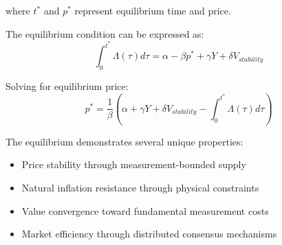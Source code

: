 \documentclass[12pt,a4paper]{article}
\begin{document}
where $t^*$ and $p^*$ represent equilibrium time and price.

The equilibrium condition can be expressed as:
\begin{equation}
\int_0^{t^*} \Lambda(\tau) d\tau = \alpha - \beta p^* + \gamma Y + \delta V_{stability}
\end{equation}

Solving for equilibrium price:
\begin{equation}
p^* = \frac{1}{\beta}\left(\alpha + \gamma Y + \delta V_{stability} - \int_0^{t^*} \Lambda(\tau) d\tau\right)
\end{equation}

The equilibrium demonstrates several unique properties:
\begin{itemize}
\item Price stability through measurement-bounded supply
\item Natural inflation resistance through physical constraints
\item Value convergence toward fundamental measurement costs
\item Market efficiency through distributed consensus mechanisms
\end{itemize}
\end{document}
